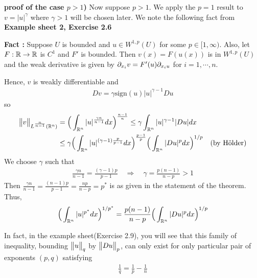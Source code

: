 \documentclass[10pt,a4paper]{report}
\newenvironment{proof}
{\begin{changemargin}{1cm}{0.5cm} 
	}%
	{\end{changemargin}
}
\newenvironment{subproof}
{\begin{changemargin}{0.5cm}{0.5cm} 
	}%
	{\end{changemargin}
}
\begin{document}
\begin{proof}
\textbf{proof of the case $p>1$) } Now suppose $p>1$. We apply the $p=1$ result to $v= |u|^{\gamma}$ where $\gamma >1$ will be chosen later. We note the following fact from \textbf{Example sheet 2, Exercise 2.6}
\begin{subproof}
\textbf{Fact :} Suppose $U$ is bounded and $u\in W^{1,p}(U)$ for some $p\in [1,\infty)$. Also, let $F: \mathbb{R} \rightarrow \mathbb{R}$ is $C^1$ and $F'$ is bounded. Then $v(x)=F(u(x))$ is in $W^{1,p}(U)$ and the weak derivative is given by $\partial_{x_i} v = F'(u) \partial_{x_i u}$ for $i=1,\cdots,n$.
\end{subproof}
Hence, $v$ is weakly differentiable and 
\begin{align*}
Dv = \gamma \text{sign}(u) |u|^{\gamma -1} Du
\end{align*}
so
\begin{align*}
\bigl\lVert v\bigr\rVert_{L^{\frac{n}{n-1}}(\mathbb{R}^n)} &= \Big( \int_{\mathbb{R}^n} |u|^{\frac{\gamma n}{n-1}}  dx \Big)^{\frac{n-1}{n}} \leq \gamma \int_{\mathbb{R}^n} |u|^{\gamma -1} |Du| dx \\
&\leq \gamma \Big( \int_{\mathbb{R}^n} |u|^{(\gamma-1) \frac{p}{p-1}} dx \Big)^{\frac{p-1}{p}} \Big( \int_{\mathbb{R}^n} |Du|^p dx \Big)^{1/p} \quad \text{(by H\"{o}lder)}
\end{align*}
We choose $\gamma$ such that
\begin{align*}
\frac{\gamma n}{n-1} = \frac{(\gamma -1)p}{p-1} \quad \Rightarrow \quad \gamma = \frac{p(n-1)}{n-p} >1
\end{align*}
Then $\frac{\gamma n}{n-1} = \frac{(n-1)p}{p-1} = \frac{np}{n-p} = p^*$ is as given in the statement of the theorem. Thus,
\begin{align*}
\Big( \int_{\mathbb{R}^n} |u|^{p^*} dx \Big)^{1/p^*} = \frac{p(n-1)}{n-p} \Big( \int_{\mathbb{R}^n} |Du|^p dx \Big)^{1/p}
\end{align*}

\eop
\end{proof}
\s

In fact, in the example sheet(Exercise 2.9), you will see that this family of inequality, bounding $\bigl\lVert u\bigr\rVert_{q}$ by $\bigl\lVert Du\bigr\rVert_{p}$, can only exist for only particular pair of exponents $(p,q)$ satisfying
\begin{align*}
\frac{1}{q} = \frac{1}{p} - \frac{1}{n}
\end{align*}
\s
\end{document}
